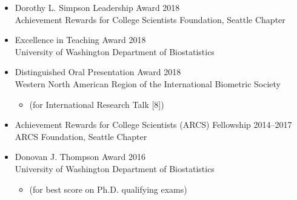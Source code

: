\documentclass[margin]{res}
\begin{document}
\begin{resume}
\begin{itemize}
\item Dorothy L. Simpson Leadership Award \hfill 2018 \\ Achievement Rewards for College Scientists Foundation, Seattle Chapter
\item Excellence in Teaching Award  \hfill 2018 \\
University of Washington Department of Biostatistics
\item Distinguished Oral Presentation Award  \hfill 2018 \\ Western North American Region of the International Biometric Society  %
	\begin{itemize}[leftmargin=-0in] \vspace{-0.2cm}
	\item[] 
	\begin{footnotesize}(for International Research Talk [8])\end{footnotesize}
	\end{itemize} \vspace{-0.1cm}
\item Achievement Rewards for College Scientists (ARCS) Fellowship \hfill 2014--2017 \\
ARCS Foundation, Seattle Chapter
\item Donovan J. Thompson Award  \hfill 2016 \\
University of Washington Department of Biostatistics %
	\begin{itemize}[leftmargin=-0in] \vspace{-0.2cm}
	\item[] 
	\begin{footnotesize}(for best score on Ph.D. qualifying exams) \end{footnotesize}%
	\end{itemize}
\end{itemize}


\end{resume}
\end{document}
